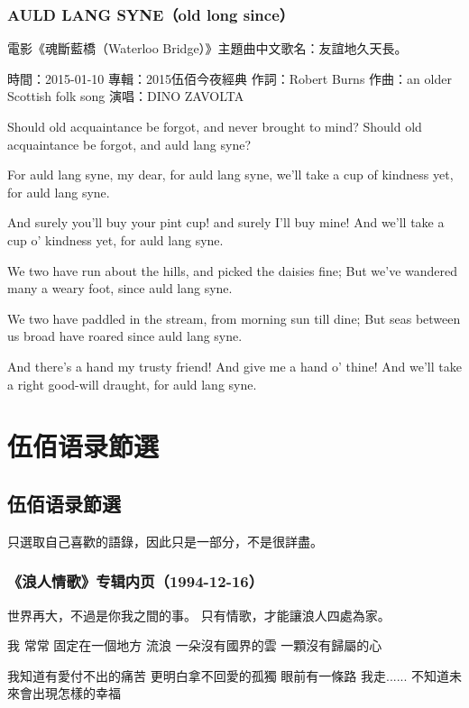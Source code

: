 \documentclass[UTF8,a4paper,oneside,twocolumn,12pt]{ctexbook}
\newcommand{\infopair}[2]{\textbullet #1：#2}
\newcommand{\zc}[1][伍佰]{\infopair{作詞}{#1}}
\newcommand{\zq}[1][伍佰]{\infopair{作曲}{#1}}
\newcommand{\zj}[1]{\infopair{專輯}{#1}}
\newcommand{\sj}[1]{\infopair{時間}{#1}}
\newenvironment{info}{\begin{flushleft}\kaishu
	}
	{\end{flushleft}\normalsize\yahei\par}
\newenvironment{lyric}{
	}
{}
\begin{document}
\section{AULD LANG SYNE（old long since）}
\begin{info}

	電影《魂斷藍橋（Waterloo Bridge）》主題曲中文歌名：友誼地久天長。

	\sj{2015-01-10}
	\zj{2015伍佰今夜經典}
	\zc[Robert Burns]
	\zq[an older Scottish folk song]
	\infopair{演唱}{DINO ZAVOLTA}
\end{info}
\begin{lyric}
	Should old acquaintance be forgot,
	and never brought to mind?
	Should old acquaintance be forgot,
	and auld lang syne?

	For auld lang syne, my dear,
	for auld lang syne,
	we'll take a cup of kindness yet,
	for auld lang syne.

	And surely you'll buy your pint cup!
	and surely I'll buy mine!
	And we'll take a cup o' kindness yet,
	for auld lang syne.

	We two have run about the hills,
	and picked the daisies fine;
	But we've wandered many a weary foot,
	since auld lang syne.

	We two have paddled in the stream,
	from morning sun till dine;
	But seas between us broad have roared
	since auld lang syne.

	And there's a hand my trusty friend!
	And give me a hand o' thine!
	And we'll take a right good-will draught,
	for auld lang syne.
\end{lyric}

\onecolumn
\part{伍佰语录節選}
\chapter{伍佰语录節選}
只選取自己喜歡的語錄，因此只是一部分，不是很詳盡。
\section{《浪人情歌》专辑内页（1994-12-16）}
世界再大，不過是你我之間的事。
只有情歌，才能讓浪人四處為家。

我 常常 固定在一個地方 流浪
一朵沒有國界的雲 一顆沒有歸屬的心

我知道有愛付不出的痛苦
更明白拿不回愛的孤獨
眼前有一條路 我走......
不知道未來會出現怎樣的幸福
\end{document}
